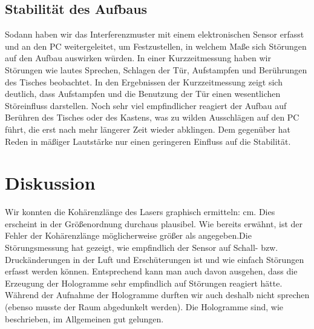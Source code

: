 \documentclass[10pt,a4paper]{article}
\begin{document}
\subsection{Stabilität des Aufbaus}

Sodann haben wir das Interferenzmuster mit einem elektronischen Sensor erfasst und an den PC weitergeleitet, um Festzustellen, in welchem Maße sich Störungen auf den Aufbau auswirken würden. In einer Kurzzeitmessung haben wir Störungen wie lautes Sprechen, Schlagen der Tür, Aufstampfen und Berührungen des Tisches beobachtet. In den Ergebnissen der Kurzzeitmessung zeigt sich deutlich, dass Aufstampfen und die Benutzung der Tür einen wesentlichen Störeinﬂuss darstellen. Noch sehr viel empfindlicher reagiert der Aufbau auf Berühren des Tisches oder des Kastens, was zu wilden Ausschlägen auf den PC führt, die erst nach mehr längerer Zeit wieder abklingen. Dem gegenüber hat Reden in mäßiger Lautstärke nur einen geringeren Einfluss auf die Stabilität.

\section{Diskussion}

Wir konnten die Kohärenzlänge des Lasers graphisch ermitteln:   cm. 
Dies erscheint in der Größenordnung durchaus plausibel. Wie bereits erwähnt, ist der Fehler der Kohärenzlänge möglicherweise größer als angegeben.Die Störungsmessung hat gezeigt, wie empﬁndlich der Sensor auf Schall- bzw. Druckänderungen in der Luft und Erschüterungen ist und wie einfach Störungen erfasst werden können. Entsprechend kann man auch davon ausgehen, dass die Erzeugung der Hologramme sehr empﬁndlich auf Störungen reagiert hätte. Während der Aufnahme der Hologramme durften wir auch deshalb nicht sprechen (ebenso musste der Raum abgedunkelt werden). Die Hologramme sind, wie beschrieben, im Allgemeinen gut gelungen.
\end{document}
